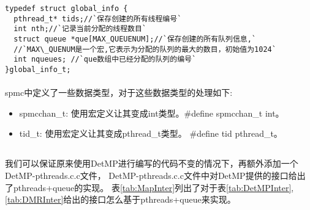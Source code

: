 \begin{lstlisting}[caption={`保存线程和队列信息的数据结构`},label={lst:global},float]
typedef struct global_info {
  pthread_t* tids;//`保存创建的所有线程编号` 
  int nth;//`记录当前分配的线程数目`
  struct queue *que[MAX_QUEUENUM];//`保存创建的所有队列信息,`
  //`MAX\_QUENUM是一个宏,它表示为分配的队列的最大的数目，初始值为1024`
  int nqueues; //`que数组中已经分配的队列的编号`
}global_info_t;
\end{lstlisting}

\paragraph{}
spmc中定义了一些数据类型，对于这些数据类型的处理如下:

\begin{itemize}
\item{spmcchan\_t: 使用宏定义让其变成int类型。\#define spmcchan\_t int。}
\item{tid\_t: 使用宏定义让其变成pthread\_t类型。 \#define tid pthread\_t。}
\end{itemize}

\subsection{}
我们可以保证原来使用DetMP进行编写的代码不变的情况下，再额外添加一个DetMP-pthreads.c.c文件，
DetMP-pthreads.c.c文件中对DetMP提供的接口给出了pthreads+queue的实现。
表\ref{tab:MapInter}列出了对于表\ref{tab:DetMPInter},\ref{tab:DMRInter}给出的接口怎么基于pthreads+queue来实现。

